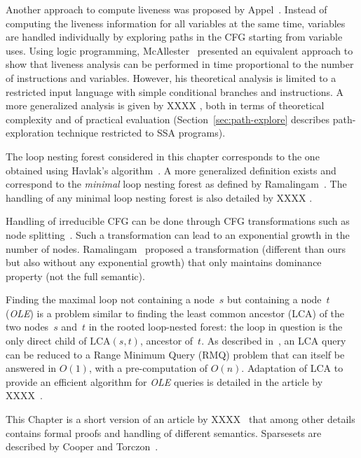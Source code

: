 Another approach to compute liveness was proposed by
Appel~\cite[p.~429]{appel:2002:modern}. Instead of computing the liveness
information for all variables at the same time, variables are handled
individually by exploring paths in the CFG starting from variable uses. 
Using logic programming, McAllester~\cite{M02} presented an equivalent approach to show that liveness analysis can be performed in time
proportional to the number of instructions and variables.
However, his theoretical analysis is limited to a restricted input language
with simple conditional branches and instructions.
A more generalized analysis is given by XXXX \cite{LivenessTACO}, both in terms of theoretical complexity and of practical evaluation (Section~\ref{sec:path-explore} describes path-exploration technique restricted to SSA programs).

The loop nesting forest considered in this chapter corresponds to the one obtained using Havlak's algorithm~\cite{havlak:loop}.
A more generalized definition exists and correspond to the \emph{minimal} loop nesting forest as defined by Ramalingam~\cite{Ramalingam02:Loops}.
The handling of any minimal loop nesting forest is also detailed by XXXX \cite{LivenessTACO}.

Handling of irreducible CFG can be done through CFG transformations such as node splitting~\cite{JC97,aho86compilers}.
Such a transformation can lead to an exponential growth in the number of nodes.
Ramalingam~\cite{Ramalingam02:Loops} proposed a transformation (different than ours but also without any exponential growth) that only maintains dominance property (not the full semantic).

Finding the maximal loop not containing a node~$s$ but containing a node~$t$ (\textit{OLE}) is a problem similar to finding the least common ancestor (LCA) of the two nodes~$s$ and~$t$ in the rooted loop-nested forest:
the loop in question is the only direct child of $\textrm{LCA}(s,t)$, ancestor of~$t$.
As described in~\cite{BenderFC00}, an LCA query can be reduced to a Range Minimum Query (RMQ) problem that can itself be answered in $O(1)$, with a pre-computation of $O(n)$.
Adaptation of LCA to provide an efficient algorithm for \textit{OLE} queries is detailed in the article by XXXX~\cite{LivenessTACO}.

This Chapter is a short version of an article by XXXX~\cite{LivenessTACO} that among other details contains formal proofs and handling of different \phifun semantics. Sparsesets are described by Cooper and Torczon~\cite{cooper:2004:engineering}.

